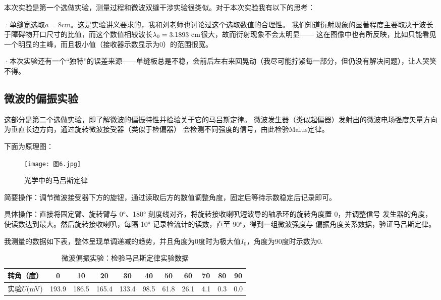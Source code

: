 \documentclass[11pt]{article}
\begin{document}
本次实验是第一个选做实验，测量过程和微波双缝干涉实验很类似。对于本次实验我有以下的思考：

·单缝宽选取$a=8$cm。这是实验讲义要求的，我和刘老师也讨论过这个选取数值的合理性。
我们知道衍射现象的显著程度主要取决于波长于障碍物开口尺寸的比值，而这个数值相较波长$\lambda_0=3.1893\,\,{\rm cm}$很大，故而衍射现象不会太明显——
这在图像中也有所反映，比如只能看见一个明显的主峰，而且极小值（接收器示数显示为0）的范围很宽。

·本次实验还有一个“独特”的误差来源——单缝板总是不稳，会前后左右来回晃动（我尽可能拧紧每一部分，但仍没有解决问题），让人哭笑不得。

























\subsection{微波的偏振实验}
这部分是第二个选做实验，即了解微波的偏振特性并检验关于它的马吕斯定律。
微波发生器（类似起偏器）发射出的微波电场强度矢量方向为垂直长边方向，通过旋转微波接受器（类似于检偏器）
会检测不同强度的信号，由此检验Malus定律。

下面为原理图：

\begin{figure}[H]
    \centering
    \texttt{[image: 图6.jpg]}
    \caption{光学中的马吕斯定律}
\end{figure}

简要操作：调节微波接受器下方的旋钮，通过读取后方的数值调整角度，固定后等待示数稳定后记录即可。

具体操作：直接将固定臂、旋转臂与 0°、180° 刻度线对齐，将旋转接收喇叭短波导的轴承环的旋转角度置 0，并调整信号
发生器的角度，使读数达到最大。然后旋转接收喇叭，每隔 10° 记录检流计的读数，直至 90°，得到一组微波强度与
偏振角度关系数据，验证马吕斯定律。

我测量的数据如下表，整体呈现单调递减的趋势，并且角度为0度时为极大值$I_0$，角度为90度时示数为0.

\begin{table}[H]
    \centering
    \begin{tabular}{ccccccccccc}\toprule
        转角（度）&0&10&20&30&40&50&60&70&80&90 \\\midrule
        实验$U$(mV) &193.9&186.5&165.4&133.4&98.5&61.8&26.1&4.1&0.3&0.0\\\bottomrule
    \end{tabular}
    \caption{微波偏振实验：检验马吕斯定律实验数据}
\end{table}
\end{document}
